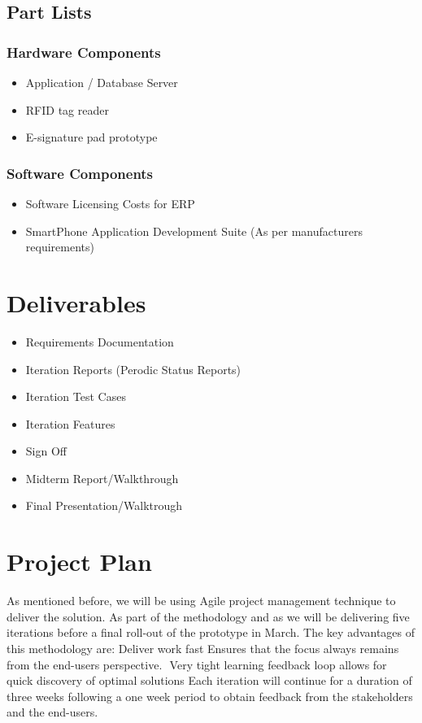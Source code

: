 \documentclass{journal}
\begin{document}
\subsection{Part Lists} 

\subsubsection{ Hardware Components }
\begin{itemize}
\item{Application / Database Server}
\item{RFID tag reader}
\item{E-signature pad prototype}
\end{itemize}

\subsubsection{ Software Components }
\begin{itemize}
\item{Software Licensing Costs for ERP }
\item{SmartPhone Application Development Suite (As per manufacturers requirements)}
\end{itemize}

\section{Deliverables}
\begin{itemize}
 \item{ Requirements Documentation }
 \item{ Iteration Reports (Perodic Status Reports) }
    \item{ Iteration Test Cases }
    \item{ Iteration Features  }
    \item{ Sign Off }
 \item{ Midterm Report/Walkthrough }
 \item{ Final Presentation/Walktrough  }
\end{itemize}
\section{Project Plan}
As mentioned before, we will be using Agile project management technique to deliver the solution. As part of the methodology and as we will be delivering five iterations before a final roll-out of the prototype in March. The key advantages of this methodology are:
Deliver work fast
Ensures that the focus always remains from the end-users perspective. 
Very tight learning feedback loop allows for quick discovery of optimal solutions
Each iteration will continue for a duration of three weeks following a one week period to obtain feedback from the stakeholders and the end-users.
\end{document}
